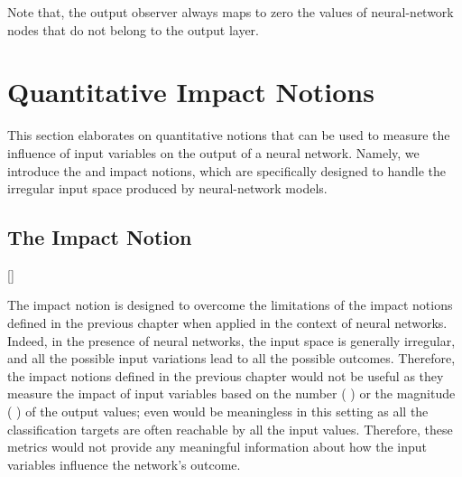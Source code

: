 Note that, the output observer always maps to zero the values of neural-network nodes that do not belong to the output layer.

\section{Quantitative Impact Notions}

This section elaborates on quantitative notions that can be used to measure the influence of input variables on the output of a neural network.
Namely, we introduce the \changesname{} and \qlibraname{} impact notions, which are specifically designed to handle the irregular input space produced by neural-network models.

\subsection{The \changesname{} Impact Notion}[\changesname]


The \changesname{} impact notion is designed to overcome the limitations of the impact notions defined in the previous chapter when applied in the context of neural networks.
Indeed, in the presence of neural networks, the input space is generally irregular, and all the possible input variations lead to all the possible outcomes.
Therefore, the impact notions defined in the previous chapter would not be useful as they measure the impact of input variables based on the number (\eg{} \outcomesname{}) or the magnitude (\eg{} \rangename{}) of the output values; even \qusedname{} would be meaningless in this setting as all the classification targets are often reachable by all the input values.
Therefore, these metrics would not provide any meaningful information about how the input variables influence the network's outcome.

